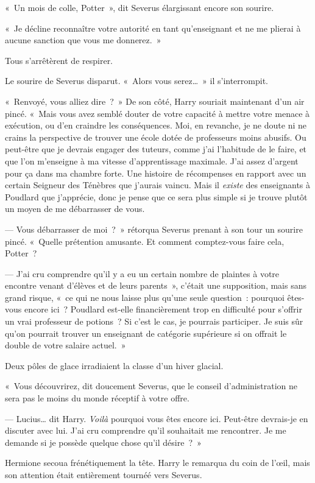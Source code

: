 «~Un mois de colle, Potter~», dit Severus élargissant encore son sourire.

«~Je décline reconnaître votre autorité en tant qu'enseignant et ne me plierai à aucune sanction que vous me donnerez.~»

Tous s'arrêtèrent de respirer.

Le sourire de Severus disparut.
«~Alors vous serez…~»
il s'interrompit.

«~Renvoyé, vous alliez dire~?~»
De son côté, Harry souriait maintenant d'un air pincé.
«~Mais vous avez semblé douter de votre capacité à mettre votre menace à exécution, ou d'en craindre les conséquences.
Moi, en revanche, je ne doute ni ne crains la perspective de trouver une école dotée de professeurs moins abusifs.
Ou peut-être que je devrais engager des tuteurs, comme j'ai l'habitude de le faire, et que l'on m'enseigne à ma vitesse d'apprentissage maximale.
J'ai assez d'argent pour ça dans ma chambre forte.
Une histoire de récompenses en rapport avec un certain Seigneur des Ténèbres que j'aurais vaincu.
Mais il \emph{existe} des enseignants à Poudlard que j'apprécie, donc je pense que ce sera plus simple si je trouve plutôt un moyen de me débarrasser de vous.

--- Vous débarrasser de moi~?~» rétorqua Severus prenant à son tour un sourire pincé.
«~Quelle prétention amusante.
Et comment comptez-vous faire cela, Potter~?

--- J'ai cru comprendre qu'il y a eu un certain nombre de plaintes à votre encontre venant d'élèves et de leurs parents~», c'était une supposition, mais sans grand risque, «~ce qui ne nous laisse plus qu'une seule question~: pourquoi êtes-vous encore ici~?
Poudlard est-elle financièrement trop en difficulté pour s'offrir un vrai professeur de potions~?
Si c'est le cas, je pourrais participer.
Je suis sûr qu'on pourrait trouver un enseignant de catégorie supérieure si on offrait le double de votre salaire actuel.~»

Deux pôles de glace irradiaient la classe d'un hiver glacial.

«~Vous découvrirez, dit doucement Severus, que le conseil d'administration ne sera pas le moins du monde réceptif à votre offre.

--- Lucius… dit Harry.
\emph{Voilà} pourquoi vous êtes encore ici.
Peut-être devrais-je en discuter avec lui.
J'ai cru comprendre qu'il souhaitait me rencontrer.
Je me demande si je possède quelque chose qu'il désire~?~»

Hermione secoua frénétiquement la tête.
Harry le remarqua du coin de l'œil, mais son attention était entièrement tournéé vers Severus.

